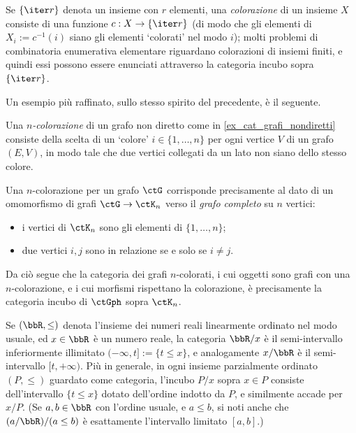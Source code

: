 \begin{example}\label{ex_set_colorati}
	Se \(\{\iter r\}\) denota un insieme con \(r\) elementi, una \emph{colorazione} di un insieme \(X\) consiste di una funzione \(c : X \to \{\iter r\}\) (di modo che gli elementi di \(X_i := c^{-1}(i)\) siano gli elementi `colorati' nel modo \(i\)); molti problemi di combinatoria enumerativa elementare riguardano colorazioni di insiemi finiti, e quindi essi possono essere enunciati attraverso la categoria incubo sopra \(\{\iter r\}\).
\end{example}
Un esempio più raffinato, sullo stesso spirito del precedente, è il seguente.
\begin{example}
	Una \emph{$n$-colorazione} di un grafo non diretto come in \ref{ex_cat_grafi_nondiretti} consiste della scelta di un `colore' $i\in\{1,\dots,n\}$ per ogni vertice $V$ di un grafo $(E,V)$, in modo tale che due vertici collegati da un lato non siano dello stesso colore.

	Una $n$-colorazione per un grafo $\ctG$ corrisponde precisamente al dato di un omomorfismo di grafi $\ctG\to\ctK_n$ verso il \emph{grafo completo} su $n$ vertici:
	\begin{itemize}
		\item i vertici di $\ctK_n$ sono gli elementi di $\{1,\dots,n\}$;
		\item due vertici $i,j$ sono in relazione se e solo se $i\ne j$.
	\end{itemize}
	Da ciò segue che la categoria dei grafi $n$-colorati, i cui oggetti sono grafi con una $n$-colorazione, e i cui morfismi rispettano la colorazione, è precisamente la categoria incubo di $\ctGph$ sopra $\ctK_n$. 
\end{example}
\begin{example}[Intervalli]\label{ex_pos_slices}
	Se \((\bbR,\le)\) denota l'insieme dei numeri reali linearmente ordinato nel modo usuale, ed \(x\in\bbR\) è un numero reale, la categoria \(\bbR/x\) è il semi-intervallo inferiormente illimitato \((-\infty,t]:=\{t\le x\}\), e analogamente \(x/\bbR\) è il semi-intervallo \([t,+\infty)\). Più in generale, in ogni insieme parzialmente ordinato \((P,\le)\) guardato come categoria, l'incubo \(P/x\) sopra \(x\in P\) consiste dell'intervallo \(\{t\le x\}\) dotato dell'ordine indotto da \(P\), e similmente accade per \(x/P\). (Se \(a,b\in\bbR\) con l'ordine usuale, e \(a\le b\), si noti anche che \((a/\bbR)/(a\le b)\) è esattamente l'intervallo limitato \([a,b]\).)
\end{example}
